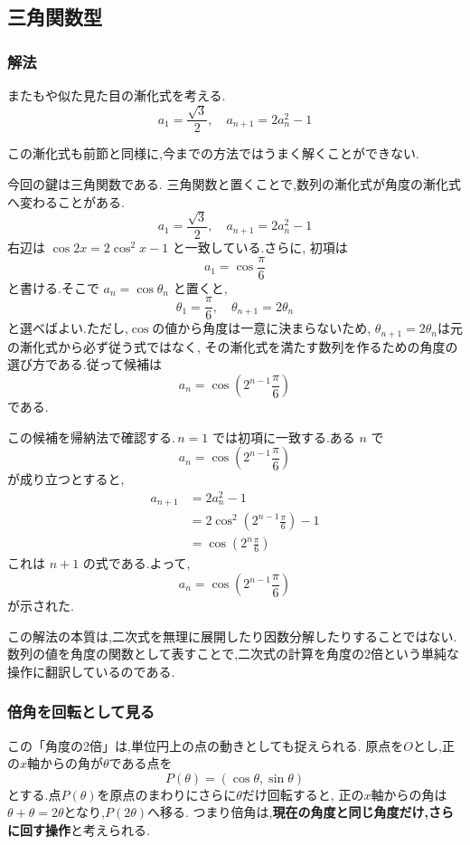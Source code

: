 \subsection{三角関数型}\label{節：三角関数型}
  \subsubsection{解法}\label{節：解法}
    またもや似た見た目の漸化式を考える.
    \[
      a_1=\frac{\sqrt{3}}{2},\quad a_{n+1}=2a_n^2-1
    \]
    
    この漸化式も前節と同様に,今までの方法ではうまく解くことができない.
    
    今回の鍵は三角関数である.
    三角関数と置くことで,数列の漸化式が角度の漸化式へ変わることがある.
    \[
      a_1=\frac{\sqrt{3}}{2},\quad a_{n+1}=2a_n^2-1
    \]
    右辺は $\cos 2x=2\cos^2x-1$ と一致している.さらに,
    初項は
    \[
      a_1=\cos\frac{\pi}{6}
    \]
    と書ける.そこで $a_n=\cos\theta_n$ と置くと,
    \[
      \theta_1=\frac{\pi}{6},
      \quad
      \theta_{n+1}=2\theta_n
    \]
    と選べばよい.ただし,$\cos$の値から角度は一意に決まらないため,
    $\theta_{n+1}=2\theta_n$は元の漸化式から必ず従う式ではなく,
    その漸化式を満たす数列を作るための角度の選び方である.従って候補は
    \[
      a_n=\cos\left(2^{n-1}\frac{\pi}{6}\right)
    \]
    である.
    
    この候補を帰納法で確認する.\,$n=1$ では初項に一致する.ある $n$ で
    \[
      a_n=\cos\left(2^{n-1}\frac{\pi}{6}\right)
    \]
    が成り立つとすると,
    \begin{align*}
      a_{n+1}
        &=2a_n^2-1\\
        &=2\cos^2\left(2^{n-1}\frac{\pi}{6}\right)-1\\
        &=\cos\left(2^n\frac{\pi}{6}\right)
    \end{align*}
    これは $n+1$ の式である.よって,
    \[
      a_n=\cos\left(2^{n-1}\frac{\pi}{6}\right)
    \]
    が示された.
    
    この解法の本質は,二次式を無理に展開したり因数分解したりすることではない.
    数列の値を角度の関数として表すことで,二次式の計算を角度の2倍という単純な操作に翻訳しているのである.
  
  \subsubsection{倍角を回転として見る}\label{節：倍角を回転として見る}
    この「角度の2倍」は,単位円上の点の動きとしても捉えられる.
    原点を$O$とし,正の$x$軸からの角が$\theta$である点を
    \[
      P(\theta)=(\cos\theta,\sin\theta)
    \]
    とする.点$P(\theta)$を原点のまわりにさらに$\theta$だけ回転すると,
    正の$x$軸からの角は$\theta+\theta=2\theta$となり,$P(2\theta)$へ移る.
    つまり倍角は,\textbf{現在の角度と同じ角度だけ,さらに回す操作}と考えられる.
    
